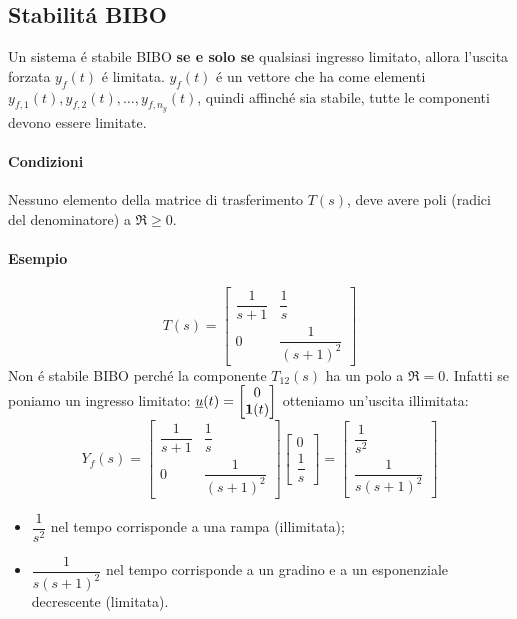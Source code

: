 \documentclass[../main.tex]{subfiles}
\begin{document}
	\subsection{Stabilit\'a BIBO}
	
		\begin{definition}
			Un sistema \'e stabile BIBO \textbf{se e solo se} qualsiasi ingresso limitato, allora l'uscita forzata $ y_f(t) $ \'e limitata. $ y_f(t) $ \'e un vettore che ha come elementi $ y_{f,1}(t), y_{f,2}(t), \dots, y_{f,n_y}(t) $, quindi affinch\'e sia stabile, tutte le componenti devono essere limitate.
		\end{definition}

		\paragraph{Condizioni}
		Nessuno elemento della matrice di trasferimento $ T(s) $, deve avere poli (radici del denominatore) a $ \Re \geq 0 $.
		
		\begin{mdframed}[style=Esempio]
			\paragraph{Esempio}
			\[ 
				T(s) =
				\begin{bmatrix}
					\dfrac{1}{s+1} & \dfrac{1}{s}
					\\[0.5cm]
					0 & \dfrac{1}{(s+1)^2}
				\end{bmatrix}
			\]
			Non \'e stabile BIBO perch\'e la componente $ T_{12}(s) $ ha un polo a $ \Re = 0 $. Infatti se poniamo un ingresso limitato: $ \underline u(t) = \left[ \begin{matrix} 0\\ \textbf{1}(t) \end{matrix} \right] $ otteniamo un'uscita illimitata:
			\[
				Y_f(s) =
				\begin{bmatrix}
					\dfrac{1}{s+1} & \dfrac{1}{s}
					\\[1em]
					0 & \dfrac{1}{(s+1)^2}
				\end{bmatrix}
				\begin{bmatrix}
					0 
					\\[1.5em]
					\dfrac{1}{s}
				\end{bmatrix} =
				\begin{bmatrix}
					\dfrac{1}{s^2}
					\\[1em]
					\dfrac{1}{s(s+1)^2}
				\end{bmatrix}
			\]
			\begin{itemize}
				\item 
					$ \dfrac{1}{s^2} $ nel tempo corrisponde a una rampa (illimitata);
				\item
					$ \dfrac{1}{s(s+1)^2} $ nel tempo corrisponde a un gradino e a un esponenziale decrescente (limitata).
			\end{itemize}
		\end{mdframed}
\end{document}
